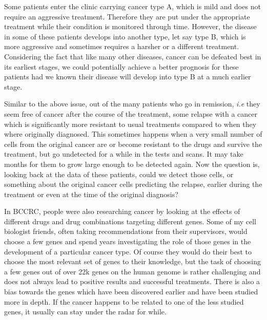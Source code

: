 Some patients enter the clinic carrying cancer type A, which is mild and does
not require an aggressive treatment. Therefore they are put under the
appropriate treatment while their condition is monitored through time. However,
the disease in some of these patients develops into another type, let say type
B, which is more aggressive and sometimes requires a harsher or a different
treatment. Considering the fact that like many other diseases, cancer can be
defeated best in its earliest stages, we could potentially achieve a better
prognosis for these patients had we known their disease will develop into type B
at a much earlier stage.

Similar to the above issue, out of the many patients who go in remission,
\emph{i.e} they seem free of cancer after the course of the treatment, some
relapse with a cancer which is significantly more resistant to usual treatments
compared to when they where originally diagnosed. This sometimes happens when a
very small number of cells from the original cancer are or become resistant to
the drugs and survive the treatment, but go undetected for a while in the tests
and scans. It may take months for them to grow large enough to be detected
again. Now the question is, looking back at the data of these patients, could we
detect those cells, or something about the original cancer cells predicting the
relapse, earlier during the treatment or even at the time of the original
diagnosis?

In BCCRC, people were also researching cancer by looking at the effects of
different drugs and drug combinations targeting different genes. Some of my cell
biologist friends, often taking recommendations from their supervisors, would
choose a few genes and spend years investigating the role of those genes in the
development of a particular cancer type. Of course they would do their best to
choose the most relevant set of genes to their knowledge, but the task of
choosing a few genes out of over 22k genes on the human genome is rather
challenging and does not always lead to positive results and successful
treatments. There is also a bias towards the genes which have been discovered
earlier and have been studied more in depth. If the cancer happens to be related
to one of the less studied genes, it usually can stay under the radar for while.

